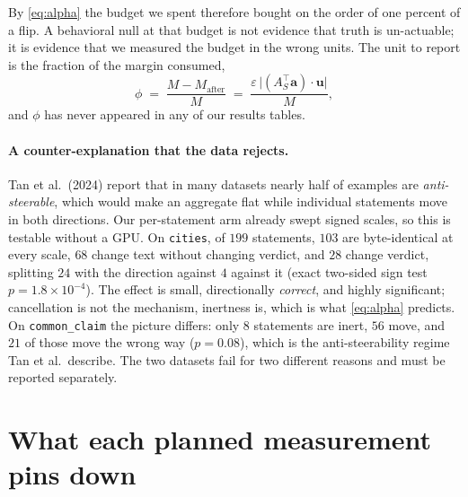 \documentclass[11pt]{article}
\newcommand{\va}{\bm{a}}
\newcommand{\vu}{\bm{u}}
\begin{document}
By \eqref{eq:alpha} the budget we spent therefore bought on the order of one percent
of a flip. A behavioral null at that budget is not evidence that truth is un-actuable;
it is evidence that we measured the budget in the wrong units. The unit to report is
the fraction of the margin consumed,
\begin{equation}
  \phi \;=\; \frac{M - M_{\text{after}}}{M}
  \;=\; \frac{\varepsilon\,\lvert (A_S^{\!\top}\va)\cdot\vu\rvert}{M},
  \label{eq:phi}
\end{equation}
and $\phi$ has never appeared in any of our results tables.

\paragraph{A counter-explanation that the data rejects.} Tan et al.\ (2024) report that
in many datasets nearly half of examples are \emph{anti-steerable}, which would make an
aggregate flat while individual statements move in both directions. Our per-statement
arm already swept signed scales, so this is testable without a GPU. On \texttt{cities},
of $199$ statements, $103$ are byte-identical at every scale, $68$ change text without
changing verdict, and $28$ change verdict, splitting $24$ with the direction against
$4$ against it (exact two-sided sign test $p = 1.8\times 10^{-4}$). The effect is
small, directionally \emph{correct}, and highly significant; cancellation is not the
mechanism, inertness is, which is what \eqref{eq:alpha} predicts. On
\texttt{common\_claim} the picture differs: only $8$ statements are inert, $56$ move,
and $21$ of those move the wrong way ($p = 0.08$), which is the anti-steerability
regime Tan et al.\ describe. The two datasets fail for two different reasons and must
be reported separately.

\section{What each planned measurement pins down}
\end{document}
